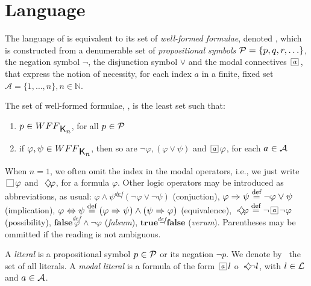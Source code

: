 \section{Language}
\label{sec:language}

The language of  is equivalent to its set of \emph{well-formed
formulae}, denoted \wff, which is constructed from a denumerable set of
\emph{propositional symbols} $\Prop = \{p, q, r, \ldots\}$, the negation
symbol $\neg$, the disjunction symbol $\lor$ and the modal connectives
$\nec{a}$, that express the notion of necessity, for each index $a$
in a finite, fixed set $\mathcal{A} = \{1, \ldots, n\}, n \in \mathbb{N}$.


\begin{definition}
\label{def:wff}
    The set of well-formed formulae, \wff, is the least set such that:
    \begin{enumerate}
        \item $p \in \wff$, for all $p \in \Prop$
            \vspace{.2ex}
        \item if $\varphi, \psi \in \wff$, then so are $\neg \varphi, (\varphi
            \lor \psi)$ and $\nec{a} \varphi$, for each $a \in \Agents$
    \end{enumerate}
\end{definition}

When $n = 1$, we often omit the index in the modal operators, i.e., we just write $\nec{} \varphi$ and $\pos{}\varphi$, for a formula $\varphi$. Other logic operators may be introduced as abbreviations, as usual:
$\varphi \wedge \psi \stackrel{def} \neg(\neg \varphi \lor \neg \psi)$
(conjuction),
$\varphi \then \psi \stackrel{def} \neg \varphi \lor \psi$ (implication),
$\varphi \iff \psi \stackrel{def} (\varphi \then \psi) \land (\psi \then
\varphi)$ (equivalence),
$\pos{a} \varphi \stackrel{def} \neg \nec{a} \neg \varphi$ (possibility),
$\textbf{false} \stackrel{def} \varphi \wedge \neg \varphi$ (\emph{falsum}),
$ \textbf{true} \stackrel{def} \neg \textbf{false}$ (\emph{verum}). Parentheses may be ommitted if the reading is not ambiguous.

A \emph{literal} is a propositional symbol $p \in \Prop$ or its negation $\neg p$. We denote by \Literals~the set of all literals. A \emph{modal literal} is a formula of the form $\nec{a} l$ o $\pos{a} \neg l$, with $l \in \Literals$ and $a \in \Agents$.

